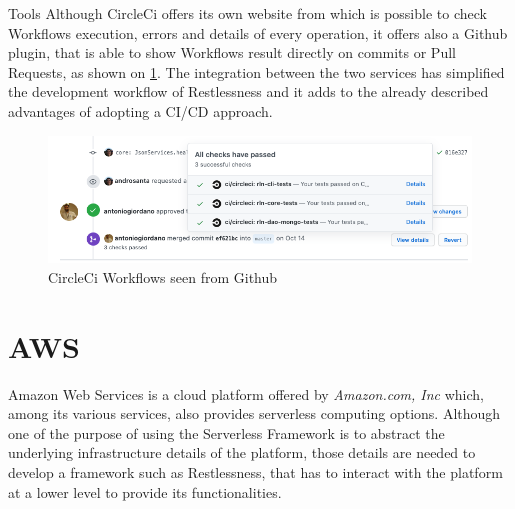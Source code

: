 \begin{chapter}{Tools}
    Although CircleCi offers its own website from which is possible to check Workflows
    execution, errors and details of every operation, it offers also a Github plugin,
    that is able to show Workflows result directly on commits or Pull Requests, as
    shown on \ref{fig:ci_github_integration}. The integration between the two
    services has simplified the development workflow of Restlessness and it adds to
    the already described advantages of adopting a CI/CD approach.



    \begin{figure}
        \centering
        \includegraphics[width=\linewidth]{source/images/ci-github-integration.png}
        \caption{CircleCi Workflows seen from Github}
        \label{fig:ci_github_integration}
    \end{figure}

    \section{AWS}
    Amazon Web Services is a cloud platform offered by \textit{Amazon.com, Inc}
    which, among its various services, also provides serverless computing options.
    Although one of the purpose of using the Serverless Framework is to abstract
    the underlying infrastructure details of the platform, those details are needed
    to develop a framework such as Restlessness, that has to interact with the
    platform at a lower level to provide its functionalities.


\end{chapter}
